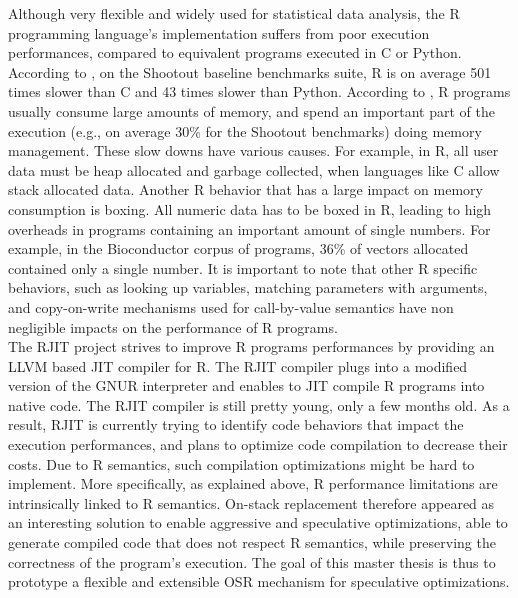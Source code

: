 Although very flexible and widely used for statistical data analysis, the R programming language's implementation suffers from poor execution performances, compared to equivalent programs executed in C or Python\cite{morandat2012evaluating}.
According to , on the Shootout baseline benchmarks suite\cite{Shootout}, R is on average 501 times slower than C and 43 times slower than Python.
According to \cite{morandat2012evaluating}, R programs usually consume large amounts of memory, and spend an important part of the execution (e.g., on average 30\% for the Shootout benchmarks) doing memory management.
These slow downs have various causes.
For example, in R, all user data must be heap allocated and garbage collected, when languages like C allow stack allocated data.
Another R behavior that has a large impact on memory consumption is boxing.
All numeric data has to be boxed in R, leading to high overheads in programs containing an important amount of single numbers.
For example, in the Bioconductor corpus of programs\cite{Bioconductor}, 36\% of vectors allocated contained only a single number\cite{morandat2012evaluating}.
It is important to note that other R specific behaviors, such as looking up variables, matching parameters with arguments, and copy-on-write mechanisms used for call-by-value semantics have non negligible impacts on the performance of R programs\cite{morandat2012evaluating}.\\

The RJIT project\cite{Rjit} strives to improve R programs performances by providing an LLVM based JIT compiler for R.
The RJIT compiler plugs into a modified version of the GNUR interpreter and enables to JIT compile R programs into native code.
The RJIT compiler is still pretty young, only a few months old.
As a result, RJIT is currently trying to identify code behaviors that impact the execution performances, and plans to optimize code compilation to decrease their costs.
Due to R semantics, such compilation optimizations might be hard to implement.
More specifically, as explained above, R performance limitations are intrinsically linked to R semantics.
On-stack replacement therefore appeared as an interesting solution to enable aggressive and speculative optimizations, able to generate compiled code that does not respect R semantics, while preserving the correctness of the program's execution.
The goal of this master thesis is thus to prototype a flexible and extensible OSR mechanism for speculative optimizations.\\

